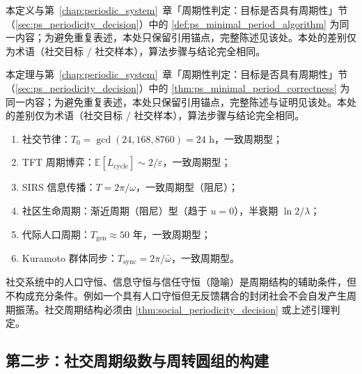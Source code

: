 \begin{definition}[社交最小正周期算法]\label{def:social_minimal_period_algorithm}
本定义与第~\ref{chap:periodic_system}~章「周期性判定：目标是否具有周期性」节（\cref{sec:ps_periodicity_decision}）中的 \cref{def:ps_minimal_period_algorithm} 为同一内容；为避免重复表述，本处只保留引用锚点，完整陈述见该处。本处的差别仅为术语（社交目标 / 社交样本），算法步骤与结论完全相同。
\end{definition}

\begin{theorem}[社交最小正周期算法的正确性]\label{thm:social_minimal_period_correctness}
本定理与第~\ref{chap:periodic_system}~章「周期性判定：目标是否具有周期性」节（\cref{sec:ps_periodicity_decision}）中的 \cref{thm:ps_minimal_period_correctness} 为同一内容；为避免重复表述，本处只保留引用锚点，完整陈述与证明见该处。本处的差别仅为术语（社交目标 / 社交样本），算法步骤与结论完全相同。
\end{theorem}

\begin{example}[社交周期判定实例]\label{ex:social_periodic_examples}
\begin{enumerate}[label=(\roman*)]
    \item 社交节律：$T_0=\gcd(24,168,8760)=24$ h，一致周期型；
    \item TFT 周期博弈：$\mathbb{E}[L_{\text{cycle}}]\sim2/\varepsilon$，一致周期型；
    \item SIRS 信息传播：$T=2\pi/\omega$，一致周期型（阻尼）；
    \item 社区生命周期：渐近周期（阻尼）型（趋于 $u=0$），半衰期 $\ln2/\lambda$；
    \item 代际人口周期：$T_{\text{gen}}\approx50$ 年，一致周期型；
    \item Kuramoto 群体同步：$T_{\text{sync}}=2\pi/\bar\omega$，一致周期型。
\end{enumerate}
\end{example}

\begin{remark}[守恒量不保证周期]\label{rem:social_invariant_not_period}
社交系统中的人口守恒、信息守恒与信任守恒（隐喻）是周期结构的辅助条件，但不构成充分条件。例如一个具有人口守恒但无反馈耦合的封闭社会不会自发产生周期振荡。社交周期结构必须由 \cref{thm:social_periodicity_decision} 或上述引理判定。
\end{remark}

\subsection{第二步：社交周期级数与周转圆组的构建}

